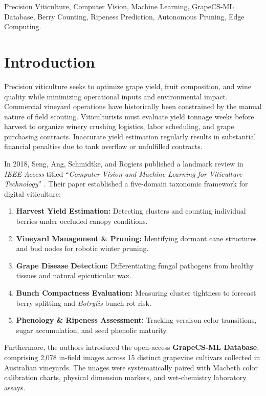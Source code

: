 \documentclass[conference]{IEEEtran}
\begin{document}
\begin{IEEEkeywords}
Precision Viticulture, Computer Vision, Machine Learning, GrapeCS-ML Database, Berry Counting, Ripeness Prediction, Autonomous Pruning, Edge Computing.
\end{IEEEkeywords}

\section{Introduction}
Precision viticulture seeks to optimize grape yield, fruit composition, and wine quality while minimizing operational inputs and environmental impact. Commercial vineyard operations have historically been constrained by the manual nature of field scouting. Viticulturists must evaluate yield tonnage weeks before harvest to organize winery crushing logistics, labor scheduling, and grape purchasing contracts. Inaccurate yield estimation regularly results in substantial financial penalties due to tank overflow or unfulfilled contracts.

In 2018, Seng, Ang, Schmidtke, and Rogiers published a landmark review in \textit{IEEE Access} titled ``\textit{Computer Vision and Machine Learning for Viticulture Technology}'' \cite{seng2018viticulture}. Their paper established a five-domain taxonomic framework for digital viticulture:
\begin{enumerate}
    \item \textbf{Harvest Yield Estimation:} Detecting clusters and counting individual berries under occluded canopy conditions.
    \item \textbf{Vineyard Management \& Pruning:} Identifying dormant cane structures and bud nodes for robotic winter pruning.
    \item \textbf{Grape Disease Detection:} Differentiating fungal pathogens from healthy tissues and natural epicuticular wax.
    \item \textbf{Bunch Compactness Evaluation:} Measuring cluster tightness to forecast berry splitting and \textit{Botrytis} bunch rot risk.
    \item \textbf{Phenology \& Ripeness Assessment:} Tracking veraison color transitions, sugar accumulation, and seed phenolic maturity.
\end{enumerate}

Furthermore, the authors introduced the open-access \textbf{GrapeCS-ML Database}, comprising 2,078 in-field images across 15 distinct grapevine cultivars collected in Australian vineyards. The images were systematically paired with Macbeth color calibration charts, physical dimension markers, and wet-chemistry laboratory assays.
\end{document}
